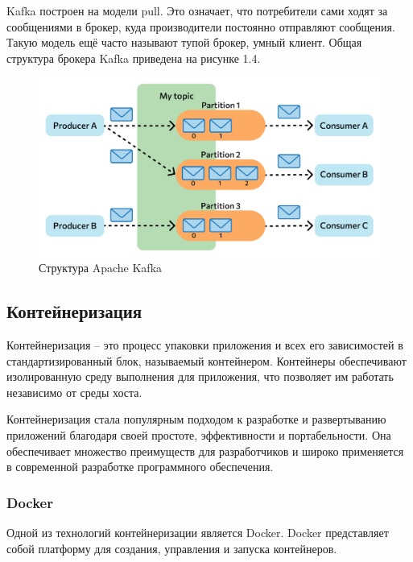 Kafka построен на модели pull.
Это означает, что потребители сами ходят за сообщениями в брокер, куда производители постоянно отправляют сообщения.
Такую модель ещё часто называют тупой брокер, умный клиент.
Общая структура брокера Kafka приведена на рисунке 1.4.

\begin{figure}[ht]
    \centering
    \includegraphics[width=.5\linewidth]{images/kafka_model}
    \caption{Структура Apache Kafka}
    \label{fig:domain:kafka-model}
\end{figure}


\subsection{Контейнеризация}\label{subsec:domain:contenarization}
Контейнеризация -- это процесс упаковки приложения и всех его зависимостей в стандартизированный блок, называемый контейнером.
Контейнеры обеспечивают изолированную среду выполнения для приложения, что позволяет им работать независимо от среды хоста.

Контейнеризация стала популярным подходом к разработке и развертыванию приложений благодаря своей простоте, эффективности и портабельности.
Она обеспечивает множество преимуществ для разработчиков  и широко применяется в современной разработке программного обеспечения.

\subsubsection{Docker}\label{subsubsec:domain:docker}
Одной из технологий контейнеризации является Docker.
Docker представляет собой платформу для создания, управления и запуска контейнеров.

